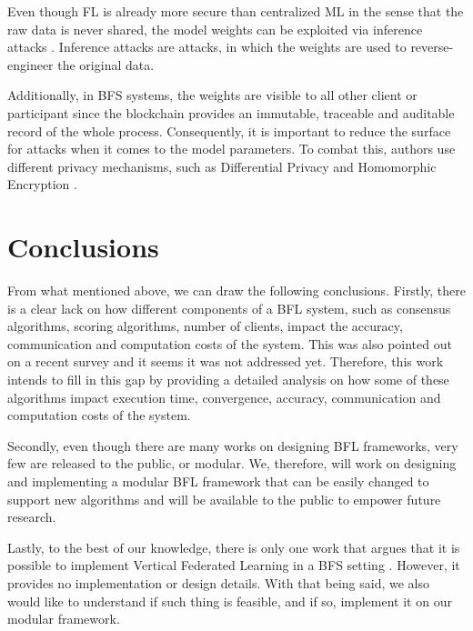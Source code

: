 Even though FL is already more secure than centralized ML in the sense that the raw data is never shared, the model weights can be exploited via inference attacks \cite{10.1145/3298981}. Inference attacks are attacks, in which the weights are used to reverse-engineer the original data.

Additionally, in BFS systems, the weights are visible to all other client or participant since the blockchain provides an immutable, traceable and auditable record of the whole process. Consequently, it is important to reduce the surface for attacks when it comes to the model parameters. To combat this, authors use different privacy mechanisms, such as Differential Privacy \cite{10.48550/arxiv.2007.03856, Peyvandi2022, 9170559} and Homomorphic Encryption \cite{8945913, 8894364}.

\section{Conclusions}\label{related_work:conclusions}

From what mentioned above, we can draw the following conclusions. Firstly, there is a clear lack on how different components of a BFL system, such as consensus algorithms, scoring algorithms, number of clients, impact the accuracy, communication and computation costs of the system. This was also pointed out on a recent survey \cite{9403374} and it seems it was not addressed yet. Therefore, this work intends to fill in this gap by providing a detailed analysis on how some of these algorithms impact execution time, convergence, accuracy, communication and computation costs of the system.

Secondly, even though there are many works on designing BFL frameworks, very few are released to the public, or modular. We, therefore, will work on designing and implementing a modular BFL framework that can be easily changed to support new algorithms and will be available to the public to empower future research.

Lastly, to the best of our knowledge, there is only one work that argues that it is possible to implement Vertical Federated Learning in a BFS setting \cite{10.48550/arxiv.1912.04859}. However, it provides no implementation or design details. With that being said, we also would like to understand if such thing is feasible, and if so, implement it on our modular framework.




